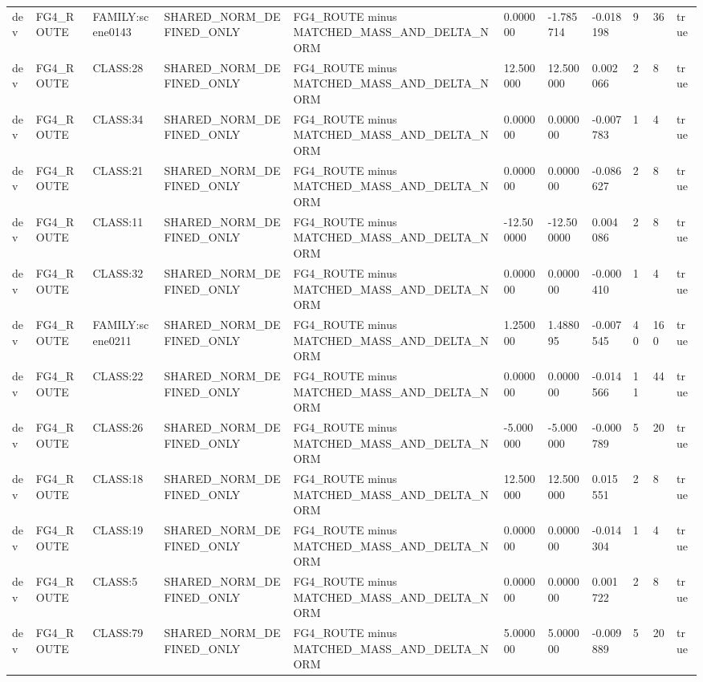 \begin{tabular}{lllllllllll}
dev & FG4\_ROUTE & FAMILY:scene0143 & SHARED\_NORM\_DEFINED\_ONLY & FG4\_ROUTE minus MATCHED\_MASS\_AND\_DELTA\_NORM & 0.000000 & -1.785714 & -0.018198 & 9 & 36 & true \\
dev & FG4\_ROUTE & CLASS:28 & SHARED\_NORM\_DEFINED\_ONLY & FG4\_ROUTE minus MATCHED\_MASS\_AND\_DELTA\_NORM & 12.500000 & 12.500000 & 0.002066 & 2 & 8 & true \\
dev & FG4\_ROUTE & CLASS:34 & SHARED\_NORM\_DEFINED\_ONLY & FG4\_ROUTE minus MATCHED\_MASS\_AND\_DELTA\_NORM & 0.000000 & 0.000000 & -0.007783 & 1 & 4 & true \\
dev & FG4\_ROUTE & CLASS:21 & SHARED\_NORM\_DEFINED\_ONLY & FG4\_ROUTE minus MATCHED\_MASS\_AND\_DELTA\_NORM & 0.000000 & 0.000000 & -0.086627 & 2 & 8 & true \\
dev & FG4\_ROUTE & CLASS:11 & SHARED\_NORM\_DEFINED\_ONLY & FG4\_ROUTE minus MATCHED\_MASS\_AND\_DELTA\_NORM & -12.500000 & -12.500000 & 0.004086 & 2 & 8 & true \\
dev & FG4\_ROUTE & CLASS:32 & SHARED\_NORM\_DEFINED\_ONLY & FG4\_ROUTE minus MATCHED\_MASS\_AND\_DELTA\_NORM & 0.000000 & 0.000000 & -0.000410 & 1 & 4 & true \\
dev & FG4\_ROUTE & FAMILY:scene0211 & SHARED\_NORM\_DEFINED\_ONLY & FG4\_ROUTE minus MATCHED\_MASS\_AND\_DELTA\_NORM & 1.250000 & 1.488095 & -0.007545 & 40 & 160 & true \\
dev & FG4\_ROUTE & CLASS:22 & SHARED\_NORM\_DEFINED\_ONLY & FG4\_ROUTE minus MATCHED\_MASS\_AND\_DELTA\_NORM & 0.000000 & 0.000000 & -0.014566 & 11 & 44 & true \\
dev & FG4\_ROUTE & CLASS:26 & SHARED\_NORM\_DEFINED\_ONLY & FG4\_ROUTE minus MATCHED\_MASS\_AND\_DELTA\_NORM & -5.000000 & -5.000000 & -0.000789 & 5 & 20 & true \\
dev & FG4\_ROUTE & CLASS:18 & SHARED\_NORM\_DEFINED\_ONLY & FG4\_ROUTE minus MATCHED\_MASS\_AND\_DELTA\_NORM & 12.500000 & 12.500000 & 0.015551 & 2 & 8 & true \\
dev & FG4\_ROUTE & CLASS:19 & SHARED\_NORM\_DEFINED\_ONLY & FG4\_ROUTE minus MATCHED\_MASS\_AND\_DELTA\_NORM & 0.000000 & 0.000000 & -0.014304 & 1 & 4 & true \\
dev & FG4\_ROUTE & CLASS:5 & SHARED\_NORM\_DEFINED\_ONLY & FG4\_ROUTE minus MATCHED\_MASS\_AND\_DELTA\_NORM & 0.000000 & 0.000000 & 0.001722 & 2 & 8 & true \\
dev & FG4\_ROUTE & CLASS:79 & SHARED\_NORM\_DEFINED\_ONLY & FG4\_ROUTE minus MATCHED\_MASS\_AND\_DELTA\_NORM & 5.000000 & 5.000000 & -0.009889 & 5 & 20 & true \\

\end{tabular}
